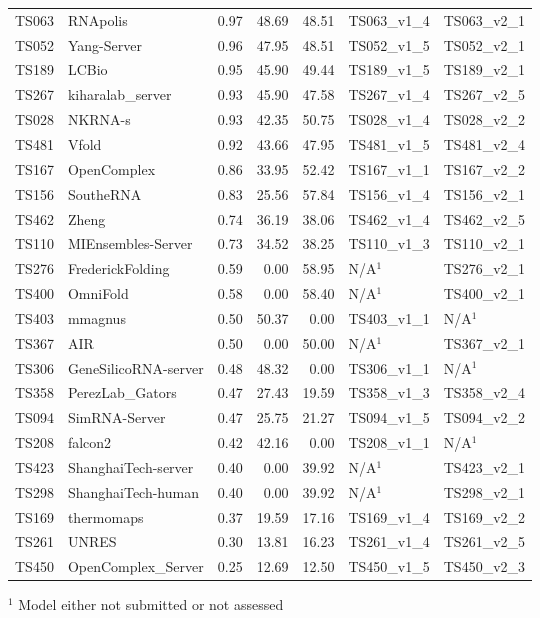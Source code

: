 \begin{table}[ht]
{\begin{tabular}{llrrrll}
TS063 & RNApolis & 0.97 & 48.69 & 48.51 & TS063\_v1\_4 & TS063\_v2\_1 \\ 
TS052 & Yang-Server & 0.96 & 47.95 & 48.51 & TS052\_v1\_5 & TS052\_v2\_1 \\ 
TS189 & LCBio & 0.95 & 45.90 & 49.44 & TS189\_v1\_5 & TS189\_v2\_1 \\ 
TS267 & kiharalab\_server & 0.93 & 45.90 & 47.58 & TS267\_v1\_4 & TS267\_v2\_5 \\ 
TS028 & NKRNA-s & 0.93 & 42.35 & 50.75 & TS028\_v1\_4 & TS028\_v2\_2 \\ 
TS481 & Vfold & 0.92 & 43.66 & 47.95 & TS481\_v1\_5 & TS481\_v2\_4 \\ 
TS167 & OpenComplex & 0.86 & 33.95 & 52.42 & TS167\_v1\_1 & TS167\_v2\_2 \\ 
TS156 & SoutheRNA & 0.83 & 25.56 & 57.84 & TS156\_v1\_4 & TS156\_v2\_1 \\ 
TS462 & Zheng & 0.74 & 36.19 & 38.06 & TS462\_v1\_4 & TS462\_v2\_5 \\ 
TS110 & MIEnsembles-Server & 0.73 & 34.52 & 38.25 & TS110\_v1\_3 & TS110\_v2\_1 \\ 
TS276 & FrederickFolding & 0.59 & 0.00 & 58.95 & N/A$^{1}$ & TS276\_v2\_1 \\ 
TS400 & OmniFold & 0.58 & 0.00 & 58.40 & N/A$^{1}$ & TS400\_v2\_1 \\ 
TS403 & mmagnus & 0.50 & 50.37 & 0.00 & TS403\_v1\_1 & N/A$^{1}$ \\ 
TS367 & AIR & 0.50 & 0.00 & 50.00 & N/A$^{1}$ & TS367\_v2\_1 \\ 
TS306 & GeneSilicoRNA-server & 0.48 & 48.32 & 0.00 & TS306\_v1\_1 & N/A$^{1}$ \\ 
TS358 & PerezLab\_Gators & 0.47 & 27.43 & 19.59 & TS358\_v1\_3 & TS358\_v2\_4 \\ 
TS094 & SimRNA-Server & 0.47 & 25.75 & 21.27 & TS094\_v1\_5 & TS094\_v2\_2 \\ 
TS208 & falcon2 & 0.42 & 42.16 & 0.00 & TS208\_v1\_1 & N/A$^{1}$ \\ 
TS423 & ShanghaiTech-server & 0.40 & 0.00 & 39.92 & N/A$^{1}$ & TS423\_v2\_1 \\ 
TS298 & ShanghaiTech-human & 0.40 & 0.00 & 39.92 & N/A$^{1}$ & TS298\_v2\_1 \\ 
TS169 & thermomaps & 0.37 & 19.59 & 17.16 & TS169\_v1\_4 & TS169\_v2\_2 \\ 
TS261 & UNRES & 0.30 & 13.81 & 16.23 & TS261\_v1\_4 & TS261\_v2\_5 \\ 
TS450 & OpenComplex\_Server & 0.25 & 12.69 & 12.50 & TS450\_v1\_5 & TS450\_v2\_3 \\ 
\bottomrule
\end{tabular}%
}
\begin{flushleft}\footnotesize $^{1}$ Model either not submitted or not assessed\end{flushleft}
\end{table}
